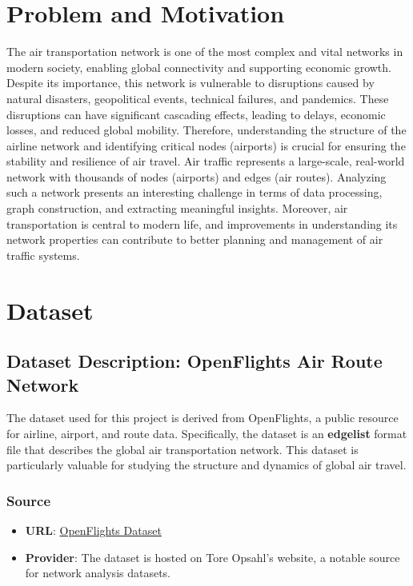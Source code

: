 \documentclass[12pt]{article}
\begin{document}
\section{Problem and Motivation}
The air transportation network is one of the most complex and vital networks in modern society, enabling global connectivity and supporting economic growth. Despite its importance, this network is vulnerable to disruptions caused by natural disasters, geopolitical events, technical failures, and pandemics. These disruptions can have significant cascading effects, leading to delays, economic losses, and reduced global mobility. Therefore, understanding the structure of the airline network and identifying critical nodes (airports) is crucial for ensuring the stability and resilience of air travel.
\newline Air traffic represents a large-scale, real-world network with thousands of nodes (airports) and edges (air routes). Analyzing such a network presents an interesting challenge in terms of data processing, graph construction, and extracting meaningful insights. Moreover, air transportation is central to modern life, and improvements in understanding its network properties can contribute to better planning and management of air traffic systems.
\section{Dataset}

\subsection{Dataset Description: OpenFlights Air Route Network}
The dataset used for this project is derived from OpenFlights, a public resource for airline, airport, and route data. Specifically, the dataset is an \textbf{edgelist} format file that describes the global air transportation network. This dataset is particularly valuable for studying the structure and dynamics of global air travel.

\subsubsection{Source}
\begin{itemize}
    \item \textbf{URL}: \href{http://opsahl.co.uk/tnet/datasets/openflights.txt}{OpenFlights Dataset}
    \item \textbf{Provider}: The dataset is hosted on Tore Opsahl’s website, a notable source for network analysis datasets.
\end{itemize}
\end{document}
